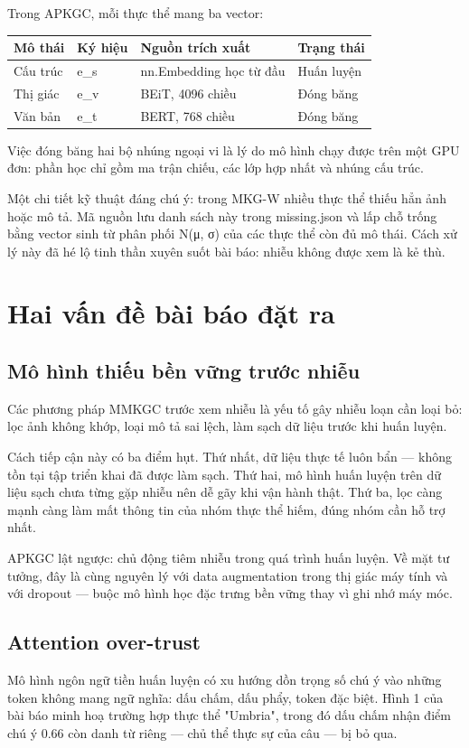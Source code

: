\documentclass[11pt,a4paper]{article}
\newcommand{\code}[1]{{\ttfamily\small\color{codetext}#1}}
\begin{document}
Trong APKGC, mỗi thực thể mang ba vector:

\begin{center}\small
\begin{tabular}{@{}llll@{}}
\toprule
\textbf{Mô thái} & \textbf{Ký hiệu} & \textbf{Nguồn trích xuất} & \textbf{Trạng thái}\\
\midrule
Cấu trúc & \code{e\_s} & \code{nn.Embedding} học từ đầu & Huấn luyện\\
Thị giác & \code{e\_v} & BEiT, 4096 chiều & Đóng băng\\
Văn bản & \code{e\_t} & BERT, 768 chiều & Đóng băng\\
\bottomrule
\end{tabular}
\end{center}
Việc đóng băng hai bộ nhúng ngoại vi là lý do mô hình chạy được trên một GPU đơn: phần học chỉ gồm ma trận chiếu, các lớp hợp nhất và nhúng cấu trúc.

Một chi tiết kỹ thuật đáng chú ý: trong MKG-W nhiều thực thể thiếu hẳn ảnh hoặc mô tả. Mã nguồn lưu danh sách này trong \code{missing.json} và lấp chỗ trống bằng vector sinh từ phân phối \code{N(μ, σ)} của các thực thể còn đủ mô thái. Cách xử lý này đã hé lộ tinh thần xuyên suốt bài báo: nhiễu không được xem là kẻ thù.

\section{Hai vấn đề bài báo đặt ra}
\subsection{Mô hình thiếu bền vững trước nhiễu}
Các phương pháp MMKGC trước xem nhiễu là yếu tố gây nhiễu loạn cần loại bỏ: lọc ảnh không khớp, loại mô tả sai lệch, làm sạch dữ liệu trước khi huấn luyện.

Cách tiếp cận này có ba điểm hụt. Thứ nhất, dữ liệu thực tế luôn bẩn --- không tồn tại tập triển khai đã được làm sạch. Thứ hai, mô hình huấn luyện trên dữ liệu sạch chưa từng gặp nhiễu nên dễ gãy khi vận hành thật. Thứ ba, lọc càng mạnh càng làm mất thông tin của nhóm thực thể hiếm, đúng nhóm cần hỗ trợ nhất.

APKGC lật ngược: chủ động tiêm nhiễu trong quá trình huấn luyện. Về mặt tư tưởng, đây là cùng nguyên lý với data augmentation trong thị giác máy tính và với dropout --- buộc mô hình học đặc trưng bền vững thay vì ghi nhớ máy móc.

\subsection{Attention over-trust}
Mô hình ngôn ngữ tiền huấn luyện có xu hướng dồn trọng số chú ý vào những token không mang ngữ nghĩa: dấu chấm, dấu phẩy, token đặc biệt. Hình 1 của bài báo minh hoạ trường hợp thực thể "Umbria", trong đó dấu chấm nhận điểm chú ý 0.66 còn danh từ riêng --- chủ thể thực sự của câu --- bị bỏ qua.
\end{document}
